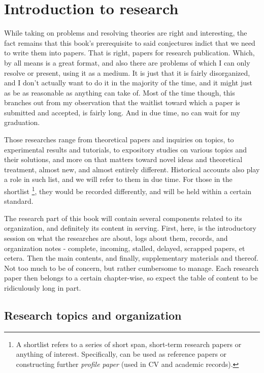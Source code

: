 \chapter*{Introduction to research}
While taking on problems and resolving theories are right and interesting, the fact remains that this book's prerequisite to said conjectures indict that we need to write them into papers. That is right, papers for research publication. Which, by all means is a great format, and also there are problems of which I can only resolve or present, using it as a medium. It is just that it is fairly disorganized, and I don't actually want to do it in the majority of the time, and it might just as be as reasonable as anything can take of. Most of the time though, this branches out from my observation that the waitlist toward which a paper is submitted and accepted, is fairly long. And in due time, no can wait for my graduation. 

Those researches range from theoretical papers and inquiries on topics, to experimental results and tutorials, to expository studies on various topics and their solutions, and more on that matters toward novel ideas and theoretical treatment, almost new, and almost entirely different. Historical accounts also play a role in such list, and we will refer to them in due time. For those in the shortlist \footnote{A shortlist refers to a series of short span, short-term research papers or anything of interest. Specifically, can be used as reference papers or constructing further \textit{profile paper} (used in CV and academic records).}, they would be recorded differently, and will be held within a certain standard. 

The research part of this book will contain several components related to its organization, and definitely its content in serving. First, here, is the introductory session on what the researches are about, logs about them, records, and organization notes - complete, incoming, stalled, delayed, scrapped papers, et cetera. Then the main contents, and finally, supplementary materials and thereof. Not too much to be of concern, but rather cumbersome to manage. Each research paper then belongs to a certain chapter-wise, so expect the table of content to be ridiculously long in part. 

\section{Research topics and organization}

